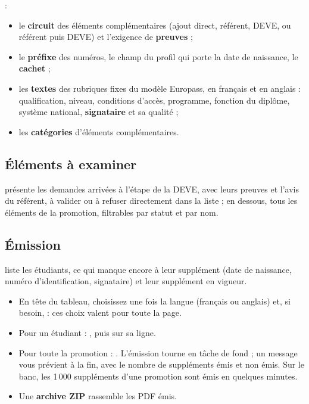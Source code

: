 \documentclass[11pt,a4paper]{article}
\begin{document}
 :
\begin{itemize}
  \item le \textbf{circuit} des éléments complémentaires (ajout direct, référent, DEVE, ou
    référent puis DEVE) et l'exigence de \textbf{preuves} ;
  \item le \textbf{préfixe} des numéros, le champ du profil qui porte la date de naissance, le
    \textbf{cachet} ;
  \item les \textbf{textes} des rubriques fixes du modèle Europass, en français et en anglais :
    qualification, niveau, conditions d'accès, programme, fonction du diplôme, système
    national, \textbf{signataire} et sa qualité ;
  \item les \textbf{catégories} d'éléments complémentaires.
\end{itemize}


\subsection{Éléments à examiner}

 présente les demandes arrivées à l'étape de la
DEVE, avec leurs preuves et l'avis du référent, à valider ou à refuser directement dans la
liste ; en dessous, tous les éléments de la promotion, filtrables par statut et par nom.


\subsection{Émission}

 liste les étudiants, ce qui manque encore
à leur supplément (date de naissance, numéro d'identification, signataire) et leur supplément
en vigueur.


\begin{itemize}
  \item En tête du tableau, choisissez une fois la langue (français ou anglais) et, si besoin,
     : ces choix valent pour toute la page.
  \item Pour un étudiant : , puis  sur sa ligne.
  \item Pour toute la promotion : . L'émission tourne
    en tâche de fond ; un message vous prévient à la fin, avec le nombre de suppléments émis et
    non émis. Sur le banc, les 1\,000 suppléments d'une promotion sont émis en quelques
    minutes.
  \item Une \textbf{archive ZIP} rassemble les PDF émis.
\end{itemize}
\end{document}

